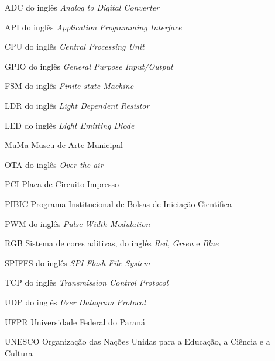 \begin{siglas}
    \item[ADC] do inglês \emph{Analog to Digital Converter}
    \item[API] do inglês \emph{Application Programming Interface}
    \item[CPU] do inglês \emph{Central Processing Unit}
    \item[GPIO] do inglês \emph{General Purpose Input/Output}
    \item[FSM] do inglês \emph{Finite-state Machine}
    \item[LDR] do inglês \emph{Light Dependent Resistor}
    \item[LED] do inglês \emph{Light Emitting Diode}
    \item[MuMa] Museu de Arte Municipal
    \item[OTA] do inglês \emph{Over-the-air}
    \item[PCI] Placa de Circuito Impresso
    \item[PIBIC] Programa Institucional de Bolsas de Iniciação Científica
    \item[PWM] do inglês \emph{Pulse Width Modulation}
    \item[RGB] Sistema de cores aditivas, do inglês \emph{Red}, \emph{Green} e \emph{Blue}
    \item[SPIFFS] do inglês \emph{SPI Flash File System}
    \item[TCP] do inglês \emph{Transmission Control Protocol}
    \item[UDP] do inglês \emph{User Datagram Protocol}
    \item[UFPR] Universidade Federal do Paraná
    \item[UNESCO] Organização das Nações Unidas para a Educação, a Ciência e a Cultura
\end{siglas}


